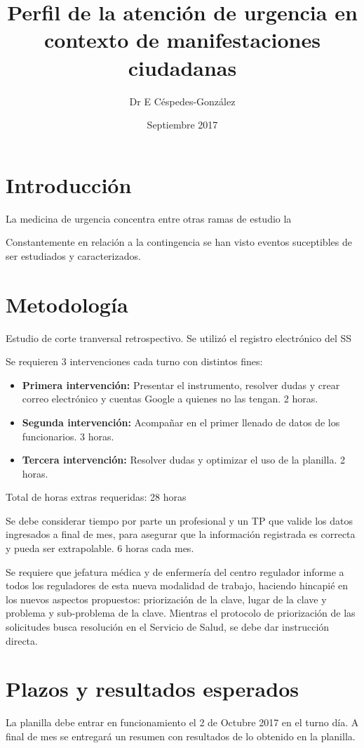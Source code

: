 \documentclass{article}
\title{Perfil de la atención de urgencia en contexto de manifestaciones ciudadanas }
\author{Dr E Céspedes-González}
\date{Septiembre 2017}
\begin{document}
\maketitle

\section{Introducción}

La medicina de urgencia concentra entre otras ramas de estudio la 

Constantemente en relación a la contingencia se han visto eventos suceptibles de ser estudiados y caracterizados.

\section{Metodología}
Estudio de corte tranversal retrospectivo. Se utilizó el registro electrónico del SS

Se requieren 3 intervenciones cada turno con distintos fines:

\begin{itemize}
  \item \textbf{Primera intervención:} Presentar el instrumento, resolver dudas y crear correo electrónico y cuentas Google a quienes no las tengan. 2 horas.
  \item \textbf{Segunda intervención:} Acompañar en el primer llenado de datos de los funcionarios. 3 horas.
  \item \textbf{Tercera intervención:}  Resolver dudas y optimizar el uso de la planilla. 2 horas.
\end{itemize}

Total de horas extras requeridas: 28 horas

Se debe considerar tiempo por parte un profesional y un TP que valide los datos ingresados a final de mes, para asegurar que la información registrada es correcta y pueda ser extrapolable. 6 horas cada mes.

Se requiere que jefatura médica y de enfermería del centro regulador informe a todos los reguladores de esta nueva modalidad de trabajo, haciendo hincapié en los nuevos aspectos propuestos: priorización de la clave, lugar de la clave y problema y sub-problema de la clave. Mientras el protocolo de priorización de las solicitudes busca resolución en el Servicio de Salud, se debe dar instrucción directa.

\section{Plazos y resultados esperados}
La planilla debe entrar en funcionamiento el 2 de Octubre 2017 en el turno día.
A final de mes se entregará un resumen con resultados de lo obtenido en la planilla.
\end{document}
